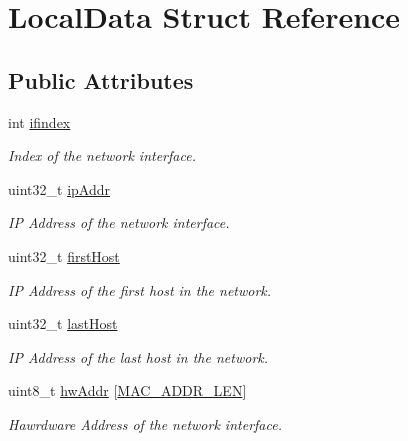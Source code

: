 \hypertarget{structLocalData}{}\section{Local\+Data Struct Reference}
\label{structLocalData}
\subsection*{Public Attributes}
\begin{DoxyCompactItemize}
\item 
int \hyperlink{structLocalData_a974757e051b9e3bce7f47ab6a26c1b23}{ifindex}\hypertarget{structLocalData_a974757e051b9e3bce7f47ab6a26c1b23}{}\label{structLocalData_a974757e051b9e3bce7f47ab6a26c1b23}

\begin{DoxyCompactList}\small\item\em Index of the network interface. \end{DoxyCompactList}\item 
uint32\+\_\+t \hyperlink{structLocalData_abea371a17d3f40b707ef388308a19c4d}{ip\+Addr}\hypertarget{structLocalData_abea371a17d3f40b707ef388308a19c4d}{}\label{structLocalData_abea371a17d3f40b707ef388308a19c4d}

\begin{DoxyCompactList}\small\item\em IP Address of the network interface. \end{DoxyCompactList}\item 
uint32\+\_\+t \hyperlink{structLocalData_a3a0ffec429a54e7aa78678e1d21226f2}{first\+Host}\hypertarget{structLocalData_a3a0ffec429a54e7aa78678e1d21226f2}{}\label{structLocalData_a3a0ffec429a54e7aa78678e1d21226f2}

\begin{DoxyCompactList}\small\item\em IP Address of the first host in the network. \end{DoxyCompactList}\item 
uint32\+\_\+t \hyperlink{structLocalData_a50f374d151cb423bae41da17e95f9ccd}{last\+Host}\hypertarget{structLocalData_a50f374d151cb423bae41da17e95f9ccd}{}\label{structLocalData_a50f374d151cb423bae41da17e95f9ccd}

\begin{DoxyCompactList}\small\item\em IP Address of the last host in the network. \end{DoxyCompactList}\item 
uint8\+\_\+t \hyperlink{structLocalData_a789b61e2ba75d850eecd2ce2e3eeae81}{hw\+Addr} \mbox{[}\hyperlink{anti__arpspoof_8cpp_a60cf9af36f952be0feb59d1f49d5edff}{M\+A\+C\+\_\+\+A\+D\+D\+R\+\_\+\+L\+EN}\mbox{]}\hypertarget{structLocalData_a789b61e2ba75d850eecd2ce2e3eeae81}{}\label{structLocalData_a789b61e2ba75d850eecd2ce2e3eeae81}

\begin{DoxyCompactList}\small\item\em Hawrdware Address of the network interface. \end{DoxyCompactList}\end{DoxyCompactItemize}


